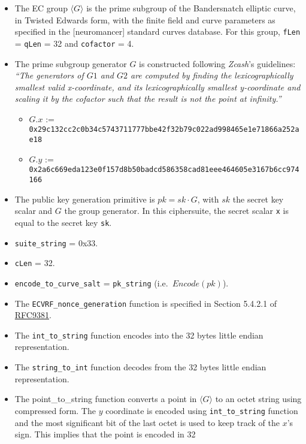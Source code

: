 \documentclass[
]{article}
\providecommand{\tightlist}{%
  \setlength{\itemsep}{0pt}\setlength{\parskip}{0pt}}
\begin{document}
\begin{itemize}
\item
  The EC group \(\langle G \rangle\) is the prime subgroup of the
  Bandersnatch elliptic curve, in Twisted Edwards form, with the finite
  field and curve parameters as specified in the {[}neuromancer{]}
  standard curves database. For this group, \texttt{fLen} =
  \texttt{qLen} = 32 and \texttt{cofactor} = 4.
\item
  The prime subgroup generator \(G\) is constructed following
  \emph{Zcash}'s guidelines: \emph{``The generators of \(G1\) and \(G2\)
  are computed by finding the lexicographically smallest valid
  x-coordinate, and its lexicographically smallest y-coordinate and
  scaling it by the cofactor such that the result is not the point at
  infinity.''}

  \begin{itemize}
  \tightlist
  \item
    \(G.x\) :=
    \texttt{0x29c132cc2c0b34c5743711777bbe42f32b79c022ad998465e1e71866a252ae18}
  \item
    \(G.y\) :=
    \texttt{0x2a6c669eda123e0f157d8b50badcd586358cad81eee464605e3167b6cc974166}
  \end{itemize}
\item
  The public key generation primitive is \(pk = sk \cdot G\), with
  \(sk\) the secret key scalar and \(G\) the group generator. In this
  ciphersuite, the secret scalar \texttt{x} is equal to the secret key
  \texttt{sk}.
\item
  \texttt{suite\_string} = 0x33.
\item
  \texttt{cLen} = 32.
\item
  \texttt{encode\_to\_curve\_salt} = \texttt{pk\_string}
  (i.e.~\(Encode(pk)\)).
\item
  The \texttt{ECVRF\_nonce\_generation} function is specified in Section
  5.4.2.1 of \href{https://datatracker.ietf.org/doc/rfc9381}{RFC9381}.
\item
  The \texttt{int\_to\_string} function encodes into the 32 bytes little
  endian representation.
\item
  The \texttt{string\_to\_int} function decodes from the 32 bytes little
  endian representation.
\item
  The point\_to\_string function converts a point in
  \(\langle G \rangle\) to an octet string using compressed form. The
  \(y\) coordinate is encoded using \texttt{int\_to\_string} function
  and the most significant bit of the last octet is used to keep track
  of the \(x\)'s sign. This implies that the point is encoded in 32

\end{itemize}
\end{document}

